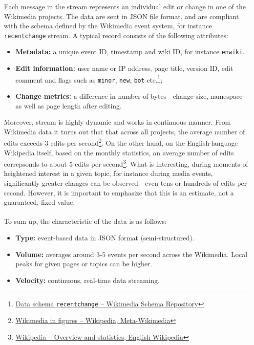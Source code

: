 \documentclass{article}
\begin{document}
Each message in the stream represents an individual edit or change in one of the Wikimedia projects. The data are sent in JSON file format, and are compliant with the schema defined by the Wikimedia event system, for instance \texttt{recentchange} stream. A typical record consists of the following attributes: 
\begin{itemize}
    \item \textbf{Metadata:} a unique event ID, timestamp and wiki ID, for instance \texttt{enwiki}. 
    \item \textbf{Edit information:} user name or IP address, page title, version ID, edit comment and flags such as \texttt{minor}, \texttt{new}, \texttt{bot} etc.\footnote{\href{https://schema.wikimedia.org/repositories/primary/jsonschema/mediawiki/recentchange/1.0.0.yaml}{Data schema \texttt{recentchange} – Wikimedia Schema Repository}};
    \item \textbf{Change metrics:} a difference in number of bytes - change size, namespace as well as page length after editing.
\end{itemize}

Moreover, stream is highly dynamic and works in continuous manner. From Wikimedia data it turns out that that across all projects, the average number of edits exceeds 3 edits per second\footnote{\href{https://meta.wikimedia.org/wiki/Wikimedia_in_figures/Wikipedia}{Wikimedia in figures – Wikipedia, Meta-Wikimedia}}. On the other hand, on the English-language Wikipedia itself, based on the monthly statistics, an average number of edits correpsonds to about 5 edits per second\footnote{\href{https://en.wikipedia.org/wiki/Wikipedia}{Wikipedia – Overview and statistics, English Wikipedia}}. What is interesting, during moments of heightened interest in a given topic, for instance during media events, significantly greater changes can be observed - even tens or hundreds of edits per second. However, it is important to emphasize that this is an estimate, not a guaranteed, fixed value.

\paragraph{}
To sum up, the characteristic of the data is as follows:
\begin{itemize}
\item \textbf{Type:} event-based data in JSON format (semi-structured). 
\item \textbf{Volume:} averages around 3-5 events per second across the Wikimedia. Local peaks for given pages or topics can be higher.
\item \textbf{Velocity:} continuous, real-time data streaming.
\end{itemize}
\end{document}
